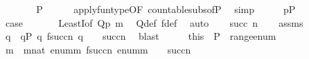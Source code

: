 \begin{isabellebody}
\ \isanewline
\ \ \isamarkupfalse%
\ {\isachardoublequoteopen}{\isasymD}{\isacharbackquote}{\kern0pt}{}\ {\isasymsubseteq}\ P{\isachardoublequoteclose}\isanewline
\ \ \ \ \isamarkupfalse%
\ apply{\isacharunderscore}{\kern0pt}funtype{\isacharbrackleft}{\kern0pt}OF\ countable{\isacharunderscore}{\kern0pt}subs{\isacharunderscore}{\kern0pt}of{\isacharunderscore}{\kern0pt}P{\isacharbrackright}{\kern0pt}\ \isamarkupfalse%
\ simp\isanewline
\ \ \isamarkupfalse%
\ \isamarkupfalse%
\ {\isacartoucheopen}p{\isasymin}P{\isacartoucheclose}\isanewline
\ \ \isamarkupfalse%
\isanewline
\ \ \isamarkupfalse%
\ {\isacharquery}{\kern0pt}case\ \isanewline
\ \ \ \ \isamarkupfalse%
\ LeastI{\isacharbrackleft}{\kern0pt}of\ {\isachardoublequoteopen}Q{\isacharparenleft}{\kern0pt}p{\isacharcomma}{\kern0pt}{}{\isacharparenright}{\kern0pt}{\isachardoublequoteclose}\ m{\isacharbrackright}{\kern0pt}\ \isamarkupfalse%
\ Q{\isacharunderscore}{\kern0pt}def\ f{\isacharunderscore}{\kern0pt}def\ \isamarkupfalse%
\ auto\isanewline
{}\isamarkupfalse%
\isanewline
\ \ \isamarkupfalse%
\ {\isacharparenleft}{\kern0pt}succ\ n{\isacharparenright}{\kern0pt}\isanewline
\ \ \isamarkupfalse%
\ assms\ \isanewline
\ \ \isamarkupfalse%
\ q\ \ {\isachardoublequoteopen}q{\isasymin}P{\isachardoublequoteclose}\ {\isachardoublequoteopen}q{\isasympreceq}\ f{\isacharparenleft}{\kern0pt}succ{\isacharparenleft}{\kern0pt}n{\isacharparenright}{\kern0pt}{\isacharparenright}{\kern0pt}{\isachardoublequoteclose}\ {\isachardoublequoteopen}q\ {\isasymin}\ {\isasymD}\ {\isacharbackquote}{\kern0pt}\ succ{\isacharparenleft}{\kern0pt}n{\isacharparenright}{\kern0pt}{\isachardoublequoteclose}\ \isamarkupfalse%
\ blast\isanewline
\ \ \isamarkupfalse%
\ \isamarkupfalse%
\ this\ \ {\isacartoucheopen}P\ {\isasymsubseteq}\ range{\isacharparenleft}{\kern0pt}enum{\isacharparenright}{\kern0pt}{\isacartoucheclose}\isanewline
\ \ \isamarkupfalse%
\ m\ \ {\isachardoublequoteopen}m{\isasymin}nat{\isachardoublequoteclose}\ {\isachardoublequoteopen}enum{\isacharbackquote}{\kern0pt}m{\isasympreceq}\ f{\isacharparenleft}{\kern0pt}succ{\isacharparenleft}{\kern0pt}n{\isacharparenright}{\kern0pt}{\isacharparenright}{\kern0pt}{\isachardoublequoteclose}\ {\isachardoublequoteopen}enum{\isacharbackquote}{\kern0pt}m\ {\isasymin}\ {\isasymD}\ {\isacharbackquote}{\kern0pt}\ succ{\isacharparenleft}{\kern0pt}n{\isacharparenright}{\kern0pt}{\isachardoublequoteclose}\isanewline

\end{isabellebody}

